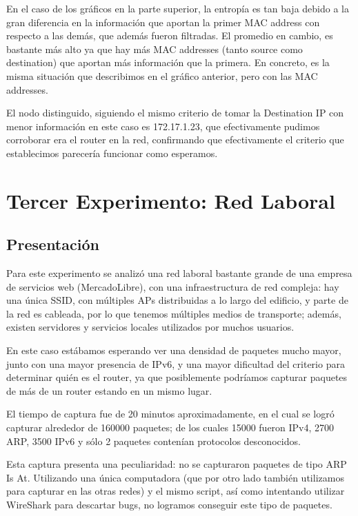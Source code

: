 \documentclass{article}
\theoremstyle{definition}
\theoremstyle{remark}
\begin{document}
En el caso de los gráficos en la parte superior, la entropía es tan baja debido a la gran diferencia en la información que aportan la primer MAC address con respecto a las demás, que además fueron filtradas. El promedio en cambio, es bastante más alto ya que hay más MAC addresses (tanto source como destination) que aportan más información que la primera. En concreto, es la misma situación que describimos en el gráfico anterior, pero con las MAC addresses.

El nodo distinguido, siguiendo el mismo criterio de tomar la Destination IP con menor información en este caso es 172.17.1.23, que efectivamente pudimos corroborar era el router en la red, confirmando que efectivamente el criterio que establecimos parecería funcionar como esperamos.

\newpage
\section{Tercer Experimento: Red Laboral}

\subsection{Presentación}
Para este experimento se analizó una red laboral bastante grande de una empresa de servicios web (MercadoLibre), con una infraestructura de red compleja: hay una única SSID, con múltiples APs distribuidas a lo largo del edificio, y parte de la red es cableada, por lo que tenemos múltiples medios de transporte; además, existen servidores y servicios locales utilizados por muchos usuarios.

En este caso estábamos esperando ver una densidad de paquetes mucho mayor, junto con una mayor presencia de IPv6, y una mayor dificultad del criterio para determinar quién es el router, ya que posiblemente podríamos capturar paquetes de más de un router estando en un mismo lugar.

El tiempo de captura fue de 20 minutos aproximadamente, en el cual se logró capturar alrededor de 160000 paquetes; de los cuales 15000 fueron IPv4, 2700 ARP, 3500 IPv6 y sólo 2 paquetes contenían protocolos desconocidos.

Esta captura presenta una peculiaridad: no se capturaron paquetes de tipo ARP Is At. Utilizando una única computadora (que por otro lado también utilizamos para capturar en las otras redes) y el mismo script, así como intentando utilizar WireShark para descartar bugs, no logramos conseguir este tipo de paquetes.
\end{document}
